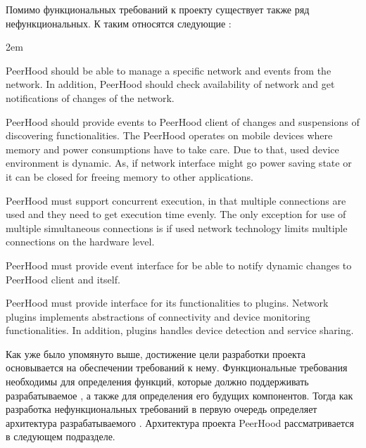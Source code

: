 \Sentence
Помимо функциональных требований к проекту \PeerHood существует также ряд нефункциональных.
\Sentence
К таким относятся следующие :
\begin{description}
	\leftskip2em%
	\setlength{\itemsep}{0pt}%
	\setlength{\parsep}{0pt}%
	\item[Network management] PeerHood should be able to manage a specific network and 
	events from the network. 
	\Sentence
	In addition, PeerHood should check availability of network and get notifications of changes 
	of the network.

	\item[Component management] PeerHood should provide events to PeerHood client of 
	changes and suspensions of discovering functionalities. 
	\Sentence
	The PeerHood operates on mobile devices where memory and power consumptions have to take 
	care. 
	\Sentence
	Due to that, used device environment is dynamic. 
	\Sentence
	As, if network interface might go power saving state or it can be closed for freeing memory 
	to other applications.

	\item[Communication concurrency base] PeerHood must support concurrent execution, 
	in that multiple connections are used and they need to get execution time evenly. 
	\Sentence
	The only exception for use of multiple simultaneous connections is if used network 
	technology limits multiple connections on the hardware level.

	\item[Event interface] PeerHood must provide event interface for be able to notify 
	dynamic changes to PeerHood client and itself.

	\item[Plugin architecture for networks] PeerHood must provide interface for its 
	functionalities to plugins. 
	\Sentence
	Network plugins implements abstractions of connectivity and device monitoring 
	functionalities. 
	\Sentence
	In addition, plugins handles device detection and service sharing.
\end{description}

\Sentence
Как уже было упомянуто выше, достижение цели разработки проекта основывается на обеспечении 
требований к нему.
\Sentence
Функциональные требования необходимы для определения функций, которые должно поддерживать 
разрабатываемое , а также для определения его будущих компонентов.
\Sentence
Тогда как разработка нефункциональных требований в первую очередь определяет архитектура 
разрабатываемого  .
\Sentence
Архитектура проекта PeerHood рассматривается в следующем подразделе.
